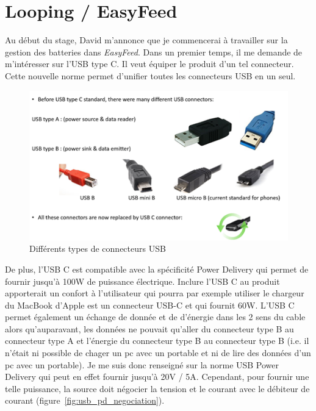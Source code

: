 \documentclass[a4paper, 11pt]{report}
\begin{document}
\section{Looping / EasyFeed}
Au début du stage, David m’annonce que je commencerai à travailler sur la gestion des batteries dans \emph{EasyFeed}.
Dans un premier temps, il me demande de m’intéresser sur l’USB type C. Il veut équiper le produit d’un tel connecteur. Cette nouvelle norme permet d’unifier toutes les connecteurs USB en un seul.

\begin{figure}[!h]
\begin{center}
\includegraphics[scale=0.75]{figures/screenshots/different_usb_types.png}
\end{center}
\caption{Différents types de connecteurs USB}
\label{fig:usb_type}
\end{figure}

De plus, l’USB C est compatible avec la spécificité Power Delivery qui permet de fournir jusqu’à 100W de puissance électrique. Inclure l’USB C au produit apporterait un confort à l’utilisateur qui pourra par exemple utiliser le chargeur du MacBook d’Apple est un connecteur USB-C et qui fournit 60W.
L'USB C permet également un échange de donnée et de d'énergie dans les 2 sens du cable alors qu'auparavant, les données ne pouvait qu'aller du connecteur type B au connecteur type A et l'énergie du connecteur type B au connecteur type B (i.e. il n'était ni possible de chager un pc avec un portable et ni de lire des données d'un pc avec un portable).
Je me suis donc renseigné sur la norme USB Power Delivery qui peut en effet fournir jusqu’à 20V / 5A. Cependant, pour fournir une telle puissance, la source doit négocier la tension et le courant avec le débiteur de courant (figure~\ref{fig:usb_pd_negociation}).
\end{document}
